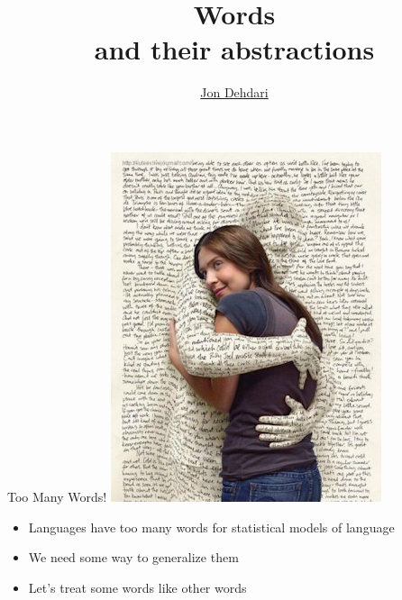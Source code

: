 \documentclass[xcolor=pdftex,x11names,table,hyperref]{beamer}
\begin{document}
\title{\LARGE{Words} \\[1.0em] \small{and their abstractions} \\[1.5em]
 }
\author{\href{http://jon.dehdari.org}{Jon Dehdari}}
\frame{\titlepage}

\begin{frame}{Too Many Words!}
	{\center \includegraphics[width=0.33\textheight]{images/word-lover.jpg}}
\begin{itemize}
	\item Languages have too many words for statistical models of language
	\pause
	\item We need some way to generalize them
	\pause
	\item Let's treat some words like other words
\end{itemize}
\end{frame}
\end{document}
